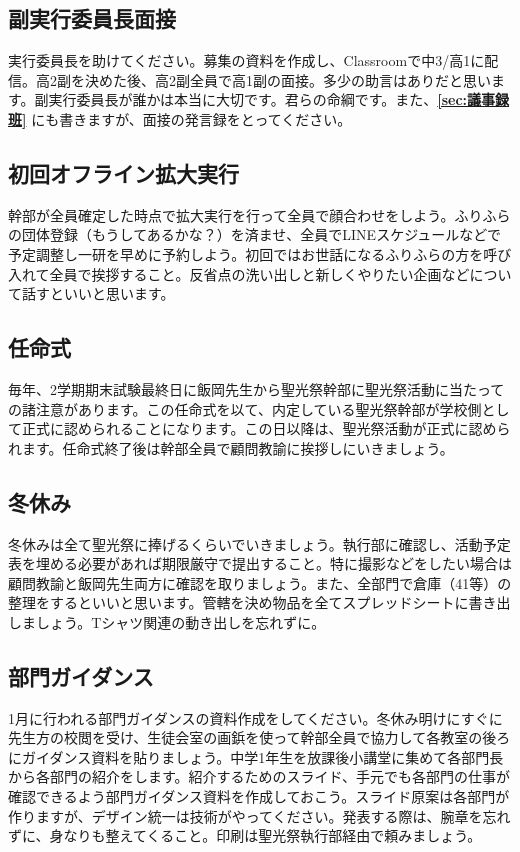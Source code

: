 \documentclass[a4paper]{ltjsreport}
\begin{document}
\subsection{副実行委員長面接}
実行委員長を助けてください。募集の資料を作成し、Classroomで中3/高1に配信。高2副を決めた後、高2副全員で高1副の面接。多少の助言はありだと思います。副実行委員長が誰かは本当に大切です。君らの命綱です。また、{\bfseries \ref{sec:議事録班}} にも書きますが、面接の発言録をとってください。

\subsection{初回オフライン拡大実行}
幹部が全員確定した時点で拡大実行を行って全員で顔合わせをしよう。ふりふらの団体登録（もうしてあるかな？）を済ませ、全員でLINEスケジュールなどで予定調整し一研を早めに予約しよう。初回ではお世話になるふりふらの方を呼び入れて全員で挨拶すること。反省点の洗い出しと新しくやりたい企画などについて話すといいと思います。

\subsection{任命式}
毎年、2学期期末試験最終日に飯岡先生から聖光祭幹部に聖光祭活動に当たっての諸注意があります。この任命式を以て、内定している聖光祭幹部が学校側として正式に認められることになります。この日以降は、聖光祭活動が正式に認められます。任命式終了後は幹部全員で顧問教諭に挨拶しにいきましょう。

\subsection{冬休み}
冬休みは全て聖光祭に捧げるくらいでいきましょう。執行部に確認し、活動予定表を埋める必要があれば期限厳守で提出すること。特に撮影などをしたい場合は顧問教諭と飯岡先生両方に確認を取りましょう。また、全部門で倉庫（41等）の整理をするといいと思います。管轄を決め物品を全てスプレッドシートに書き出しましょう。Tシャツ関連の動き出しを忘れずに。

\subsection{部門ガイダンス}
1月に行われる部門ガイダンスの資料作成をしてください。冬休み明けにすぐに先生方の校閲を受け、生徒会室の画鋲を使って幹部全員で協力して各教室の後ろにガイダンス資料を貼りましょう。中学1年生を放課後小講堂に集めて各部門長から各部門の紹介をします。紹介するためのスライド、手元でも各部門の仕事が確認できるよう部門ガイダンス資料を作成しておこう。スライド原案は各部門が作りますが、デザイン統一は技術がやってください。発表する際は、腕章を忘れずに、身なりも整えてくること。印刷は聖光祭執行部経由で頼みましょう。
\end{document}
